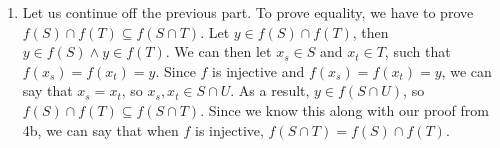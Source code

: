 \documentclass{article}
\begin{document}
\begin{enumerate}[label=\textbf{\arabic*}.]
\begin{enumerate}[label=\textbf{\alph*}.]
            \item Let us continue off the previous part. To prove equality, we have to prove $f(S) \cap f(T) \subseteq f(S \cap T)$. Let $y \in f(S) \cap f(T)$, then $y \in f(S) \land y \in f(T)$. We can then let $x_s \in S$ and $x_t \in T$, such that $f(x_s)=f(x_t)=y$. Since $f$ is injective and $f(x_s)=f(x_t)=y$, we can say that $x_s=x_t$, so $x_s,x_t \in S \cap U$. As a result, $y \in f(S \cap U)$, so $f(S) \cap f(T) \subseteq f(S \cap T)$. Since we know this along with our proof from 4b, we can say that when $f$ is injective, $f(S \cap T) = f(S) \cap f(T)$.
        \end{enumerate}
\end{enumerate}
\end{document}
